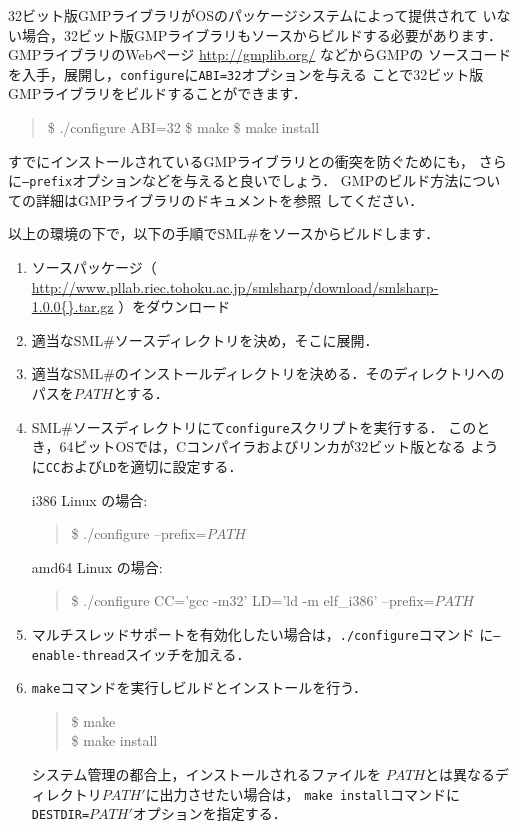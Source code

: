 \documentclass{jbook}
\newcommand{\smlsharp}{SML\#}
\newcommand{\version}{1.0.0}
\newenvironment{program}{\begin{tt}\begin{quote}}{\end{quote}\end{tt}}
\begin{document}
	32ビット版GMPライブラリがOSのパッケージシステムによって提供されて
いない場合，32ビット版GMPライブラリもソースからビルドする必要があります．
	GMPライブラリのWebページ \url{http://gmplib.org/} などからGMPの
ソースコードを入手，展開し，{\tt configure}に{\tt ABI=32}オプションを与える
ことで32ビット版GMPライブラリをビルドすることができます．
\begin{program}
\$ ./configure ABI=32
\$ make
\$ make install
\end{program}
	すでにインストールされているGMPライブラリとの衝突を防ぐためにも，
さらに{\tt --prefix}オプションなどを与えると良いでしょう．
	GMPのビルド方法についての詳細はGMPライブラリのドキュメントを参照
してください．


	以上の環境の下で，以下の手順で\smlsharp{}をソースからビルドします．
\begin{enumerate}
\item ソースパッケージ（
\url{http://www.pllab.riec.tohoku.ac.jp/smlsharp/download/smlsharp-\version{}.tar.gz}
）をダウンロード
\item 適当な\smlsharp{}ソースディレクトリを決め，そこに展開．
\item 適当な\smlsharp{}のインストールディレクトリを決める．そのディレクトリへのパスを$PATH$とする．
\item
	\smlsharp{}ソースディレクトリにて{\tt configure}スクリプトを実行する．
        このとき，64ビットOSでは，Cコンパイラおよびリンカが32ビット版となる
ように{\tt CC}および{\tt LD}を適切に設定する．

i386 Linux の場合:
\begin{program}
\$ ./configure --prefix=$PATH$
\end{program}
amd64 Linux の場合:
\begin{program}
\$ ./configure CC='gcc -m32' LD='ld -m elf\_i386' --prefix=$PATH$
\end{program}
\item

	マルチスレッドサポートを有効化したい場合は，{\tt ./configure}コマンド
に{\tt --enable-thread}スイッチを加える．
\item
	{\tt make}コマンドを実行しビルドとインストールを行う．
\begin{program}
\$ make\\
\$ make install
\end{program}
	システム管理の都合上，インストールされるファイルを
$PATH$とは異なるディレクトリ$PATH'$に出力させたい場合は，
{\tt make install}コマンドに{\tt DESTDIR=$PATH'$}オプションを指定する．
\end{enumerate}
\end{document}
